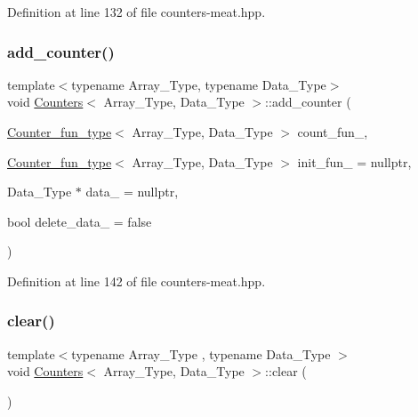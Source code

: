 Definition at line 132 of file counters-\/meat.\+hpp.

\mbox{\label{class_counters_a4ee47504f9c76892c6028619e6b138ee}} 
\subsubsection{\texorpdfstring{add\+\_\+counter()}{add\_counter()}\hspace{0.1cm}{\footnotesize\ttfamily [3/3]}}
{\footnotesize\ttfamily template$<$typename Array\+\_\+\+Type, typename Data\+\_\+\+Type$>$ \\
void \hyperlink{class_counters}{Counters}$<$ Array\+\_\+\+Type, Data\+\_\+\+Type $>$\+::add\+\_\+counter (\begin{DoxyParamCaption}\item[{\hyperlink{typedefs_8hpp_a1e12ad6cdda3588f5b2157a5ad3177d2}{Counter\+\_\+fun\+\_\+type}$<$ Array\+\_\+\+Type, Data\+\_\+\+Type $>$}]{count\+\_\+fun\+\_\+,  }\item[{\hyperlink{typedefs_8hpp_a1e12ad6cdda3588f5b2157a5ad3177d2}{Counter\+\_\+fun\+\_\+type}$<$ Array\+\_\+\+Type, Data\+\_\+\+Type $>$}]{init\+\_\+fun\+\_\+ = {\ttfamily nullptr},  }\item[{Data\+\_\+\+Type $\ast$}]{data\+\_\+ = {\ttfamily nullptr},  }\item[{bool}]{delete\+\_\+data\+\_\+ = {\ttfamily false} }\end{DoxyParamCaption})\hspace{0.3cm}{\ttfamily [inline]}}



Definition at line 142 of file counters-\/meat.\+hpp.

\mbox{\label{class_counters_ae4635c154970a13ce88d2e982fe7dab3}} 
\subsubsection{\texorpdfstring{clear()}{clear()}}
{\footnotesize\ttfamily template$<$typename Array\+\_\+\+Type , typename Data\+\_\+\+Type $>$ \\
void \hyperlink{class_counters}{Counters}$<$ Array\+\_\+\+Type, Data\+\_\+\+Type $>$\+::clear (\begin{DoxyParamCaption}{ }\end{DoxyParamCaption})\hspace{0.3cm}{\ttfamily [inline]}}



